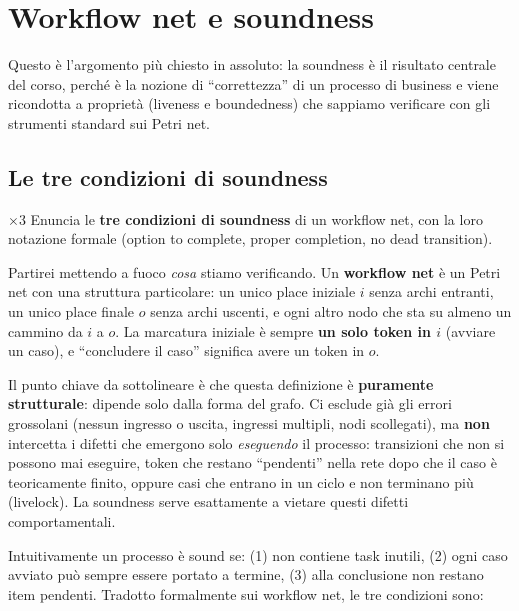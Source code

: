 \chapter{Workflow net e soundness}

Questo è l'argomento più chiesto in assoluto: la soundness è il risultato centrale del corso, perché è la nozione di ``correttezza'' di un processo di business e viene ricondotta a proprietà (liveness e boundedness) che sappiamo verificare con gli strumenti standard sui Petri net.

\section{Le tre condizioni di soundness}

\begin{domanda}{$\times 3$}
Enuncia le \textbf{tre condizioni di soundness} di un workflow net, con la loro notazione formale (option to complete, proper completion, no dead transition).
\end{domanda}

Partirei mettendo a fuoco \emph{cosa} stiamo verificando. Un \textbf{workflow net} è un Petri net con una struttura particolare: un unico place iniziale $i$ senza archi entranti, un unico place finale $o$ senza archi uscenti, e ogni altro nodo che sta su almeno un cammino da $i$ a $o$. La marcatura iniziale è sempre \textbf{un solo token in $i$} (avviare un caso), e ``concludere il caso'' significa avere un token in $o$.

Il punto chiave da sottolineare è che questa definizione è \textbf{puramente strutturale}: dipende solo dalla forma del grafo. Ci esclude già gli errori grossolani (nessun ingresso o uscita, ingressi multipli, nodi scollegati), ma \textbf{non} intercetta i difetti che emergono solo \emph{eseguendo} il processo: transizioni che non si possono mai eseguire, token che restano ``pendenti'' nella rete dopo che il caso è teoricamente finito, oppure casi che entrano in un ciclo e non terminano più (livelock). La soundness serve esattamente a vietare questi difetti comportamentali.

Intuitivamente un processo è sound se: (1) non contiene task inutili, (2) ogni caso avviato può sempre essere portato a termine, (3) alla conclusione non restano item pendenti. Tradotto formalmente sui workflow net, le tre condizioni sono:

